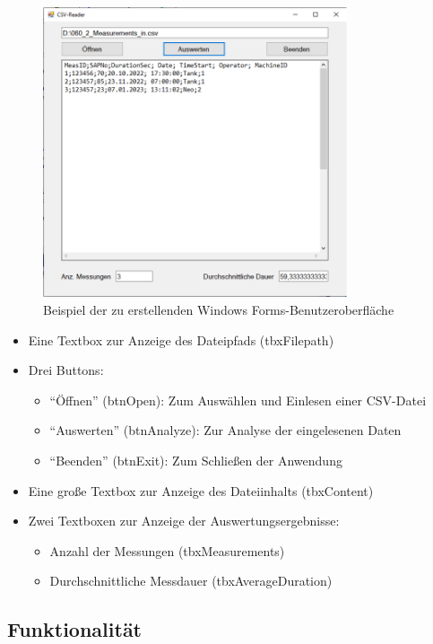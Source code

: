 \documentclass[a4paper,11pt]{article}
\begin{document}
\begin{figure}[htbp]
    \centering
    \includegraphics[width=0.8\textwidth]{screenshot.png}
    \caption{Beispiel der zu erstellenden Windows Forms-Benutzeroberfläche}
    \label{fig:screenshot}
\end{figure}

\begin{itemize}
    \item Eine Textbox zur Anzeige des Dateipfads (tbxFilepath)
    \item Drei Buttons:
    \begin{itemize}
        \item ``Öffnen'' (btnOpen): Zum Auswählen und Einlesen einer CSV-Datei
        \item ``Auswerten'' (btnAnalyze): Zur Analyse der eingelesenen Daten
        \item ``Beenden'' (btnExit): Zum Schließen der Anwendung
    \end{itemize}
    \item Eine große Textbox zur Anzeige des Dateiinhalts (tbxContent)
    \item Zwei Textboxen zur Anzeige der Auswertungsergebnisse:
    \begin{itemize}
        \item Anzahl der Messungen (tbxMeasurements)
        \item Durchschnittliche Messdauer (tbxAverageDuration)
    \end{itemize}
\end{itemize}


\subsection{Funktionalität}
\end{document}
